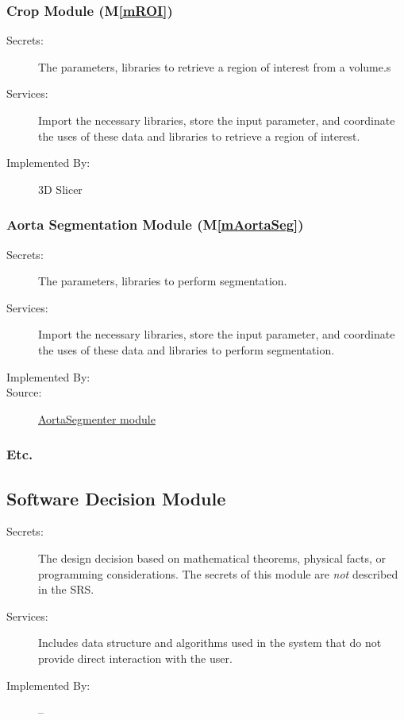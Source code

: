 \documentclass[12pt, titlepage]{article}
\newcommand{\mref}[1]{M\ref{#1}}
\begin{document}
\subsubsection{Crop Module (\mref{mROI})}
\begin{description}
\item[Secrets:] The parameters, libraries to retrieve a region of interest from a volume.s
\item[Services:] Import the necessary libraries, store the input parameter, and coordinate the uses of these data and libraries to retrieve a region of interest.
\item[Implemented By:] 3D Slicer
\end{description}

\subsubsection{Aorta Segmentation Module (\mref{mAortaSeg})}
\begin{description}
\item[Secrets:] The parameters, libraries to perform segmentation.
\item[Services:] Import the necessary libraries, store the input parameter, and coordinate the uses of these data and libraries to perform segmentation.
\item[Implemented By:] \progname
\item[Source:] \href{https://joviel25.github.io/AortaGR-design-document/AortaGeomReconDisplayModuleLib.html#module-AortaSegmenter}{AortaSegmenter module}
\end{description}


\subsubsection{Etc.}


\subsection{Software Decision Module}

\begin{description}
\item[Secrets:] The design decision based on mathematical theorems, physical
  facts, or programming considerations. The secrets of this module are
  \emph{not} described in the SRS.
\item[Services:] Includes data structure and algorithms used in the system that
  do not provide direct interaction with the user. 
\item[Implemented By:] --
\end{description}
\end{document}
